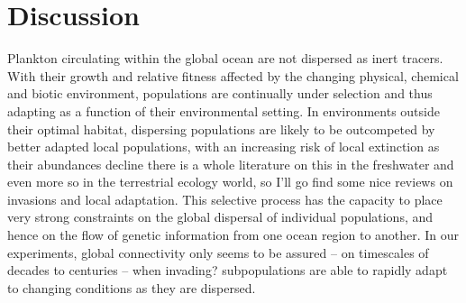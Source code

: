 \documentclass[12pt]{article}
\newcommand{\sinead}[1]{{\color{green} #1}}
\begin{document}

\section*{Discussion}

Plankton circulating within the global ocean are not dispersed as inert tracers. With their growth and relative fitness affected by the changing physical, chemical and biotic environment, populations are continually under selection \sinead{and thus adapting} as a function of their environmental setting. In environments outside their optimal habitat, dispersing populations are likely to be outcompeted by better adapted local populations, with an increasing risk of local extinction as their abundances decline \sinead{there is a whole literature on this in the freshwater and even more so in the terrestrial ecology world, so I'll go find some nice reviews on invasions and local adaptation}. This selective process has the capacity to place very strong constraints on the global dispersal of individual populations, and hence on the flow of genetic information from one ocean region to another. In our experiments, global connectivity only seems to be assured -- on timescales of decades to centuries -- when \sinead{invading?} subpopulations are able to rapidly adapt to changing conditions as they are dispersed.
\end{document}
